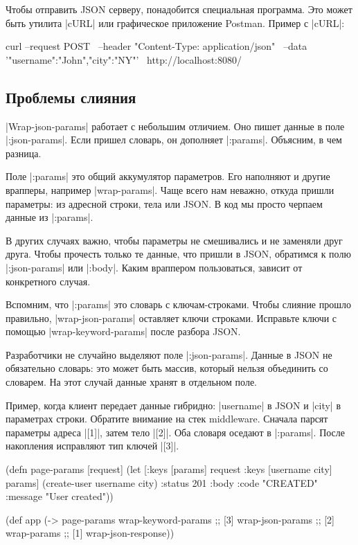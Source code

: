 Чтобы отправить JSON серверу, понадобится специальная программа. Это может быть
утилита \spverb|cURL| или графическое приложение
Postman. Пример с \spverb|cURL|:

\begin{english}
  \begin{bash}
curl --request POST \
     --header "Content-Type: application/json" \
     --data '{"username":"John","city":"NY"}' \
     http://localhost:8080/
  \end{bash}
\end{english}

\subsection{Проблемы слияния}

\spverb|Wrap-json-params| работает с небольшим отличием. Оно пишет данные в поле
\spverb|:json-params|. Если пришел словарь, он дополняет
\spverb|:params|. Объясним, в чем разница.

Поле \spverb|:params| это общий аккумулятор параметров. Его наполняют и другие
врапперы, например \spverb|wrap-params|. Чаще всего нам неважно, откуда пришли
параметры: из адресной строки, тела или JSON. В код мы просто черпаем данные из
\spverb|:params|.

В других случаях важно, чтобы параметры не смешивались и не заменяли друг
друга. Чтобы прочесть только те данные, что пришли в JSON, обратимся к полю
\spverb|:json-params| или \spverb|:body|. Каким враппером пользоваться, зависит
от конкретного случая.

Вспомним, что \spverb|:params| это словарь с ключам-строками. Чтобы слияние
прошло правильно, \spverb|wrap-json-params| оставляет ключи строками. Исправьте
ключи с помощью \spverb|wrap-keyword-params| после разбора JSON.

Разработчики не случайно выделяют поле \spverb|:json-params|. Данные в JSON не
обязательно словарь: это может быть массив, который нельзя объединить со
словарем. На этот случай данные хранят в отдельном поле.

Пример, когда клиент передает данные гибридно: \spverb|username| в JSON и
\spverb|city| в параметрах строки. Обратите внимание на стек middleware. Сначала
парсят параметры адреса \spverb|[1]|, затем тело \spverb|[2]|. Оба словаря
оседают в \spverb|:params|. После накопления исправляют тип ключей \spverb|[3]|.

\begin{english}
  \begin{clojure}
(defn page-params [request]
  (let [{:keys [params]} request
        {:keys [username city]} params]
    (create-user username city)
    {:status 201
     :body {:code "CREATED"
            :message "User created"}}))

(def app (-> page-params
             wrap-keyword-params ;; [3]
             wrap-json-params    ;; [2]
             wrap-params         ;; [1]
             wrap-json-response))
  \end{clojure}
\end{english}

